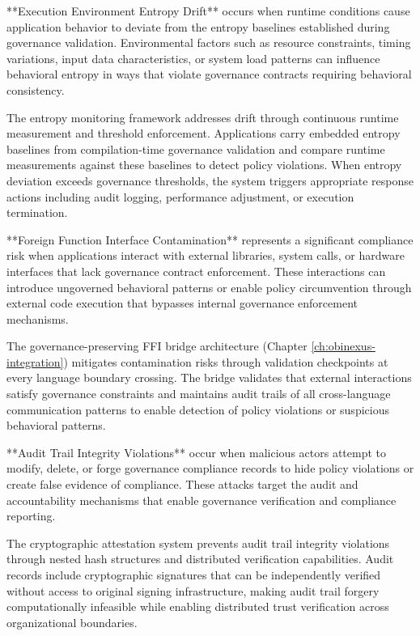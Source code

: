**Execution Environment Entropy Drift** occurs when runtime conditions cause application behavior to deviate from the entropy baselines established during governance validation. Environmental factors such as resource constraints, timing variations, input data characteristics, or system load patterns can influence behavioral entropy in ways that violate governance contracts requiring behavioral consistency.

The entropy monitoring framework addresses drift through continuous runtime measurement and threshold enforcement. Applications carry embedded entropy baselines from compilation-time governance validation and compare runtime measurements against these baselines to detect policy violations. When entropy deviation exceeds governance thresholds, the system triggers appropriate response actions including audit logging, performance adjustment, or execution termination.

**Foreign Function Interface Contamination** represents a significant compliance risk when applications interact with external libraries, system calls, or hardware interfaces that lack governance contract enforcement. These interactions can introduce ungoverned behavioral patterns or enable policy circumvention through external code execution that bypasses internal governance enforcement mechanisms.

The governance-preserving FFI bridge architecture (Chapter \ref{ch:obinexus-integration}) mitigates contamination risks through validation checkpoints at every language boundary crossing. The bridge validates that external interactions satisfy governance constraints and maintains audit trails of all cross-language communication patterns to enable detection of policy violations or suspicious behavioral patterns.

**Audit Trail Integrity Violations** occur when malicious actors attempt to modify, delete, or forge governance compliance records to hide policy violations or create false evidence of compliance. These attacks target the audit and accountability mechanisms that enable governance verification and compliance reporting.

The cryptographic attestation system prevents audit trail integrity violations through nested hash structures and distributed verification capabilities. Audit records include cryptographic signatures that can be independently verified without access to original signing infrastructure, making audit trail forgery computationally infeasible while enabling distributed trust verification across organizational boundaries.

